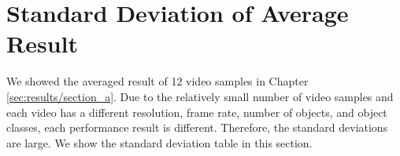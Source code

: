 \section{Standard Deviation of Average Result}
\label{sec:appendix/section_std_dev}

We showed the averaged result of 12 video samples in Chapter \ref{sec:results/section_a}. Due to the relatively small number of video samples and each video has a different resolution, frame rate, number of objects, and object classes, each performance result is different. Therefore, the standard deviations are large. We show the standard deviation table in this section.
